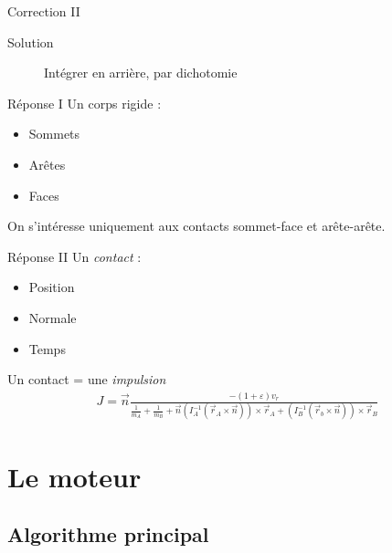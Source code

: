 \documentclass{beamer}
\begin{document}
\begin{frame}{Correction II}
 \begin{description}
    \item[Solution] Intégrer en arrière, par dichotomie
  \end{description}

  \begin{figure}
    \centering
    
  \end{figure}
\end{frame}

\begin{frame}{Réponse I}
  Un corps rigide :
  \begin{itemize}
  \item Sommets
  \item Arêtes
  \item Faces
  \end{itemize}

  On s'intéresse uniquement aux contacts sommet-face et arête-arête.

  \begin{figure}
    \centering
    
    
  \end{figure}
\end{frame}

\begin{frame}{Réponse II}
  Un \textit{contact} :
  \begin{itemize}
  \item Position
  \item Normale
  \item Temps
  \end{itemize}

  \vfill

  Un contact = une \textit{impulsion}
  \begin{align*}
    J = \vec{n} 
    \frac{-(1 + \varepsilon) v_r}{
      \frac{1}{m_A} +
      \frac{1}{m_B} +
      \vec{n}
      (I_A^{-1} (\vec{r}_A \times \vec{n})) \times \vec{r}_A +
      (I_B^{-1} (\vec{r}_b \times \vec{n})) \times \vec{r}_B
    }
  \end{align*}
\end{frame}

\section{Le moteur}

\subsection{Algorithme principal}
\end{document}
